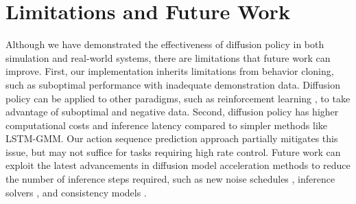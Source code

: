 
\section{Limitations and Future Work}

Although we have demonstrated the effectiveness of diffusion policy in both simulation and real-world systems, there are limitations that future work can improve. 
First, our implementation inherits limitations from behavior cloning, such as suboptimal performance with inadequate demonstration data. Diffusion policy can be applied to other paradigms, such as reinforcement learning \cite{wang2023diffusion,hansen2023idql}, to take advantage of suboptimal and negative data. 
Second, diffusion policy has higher computational costs and inference latency compared to simpler methods like LSTM-GMM. Our action sequence prediction approach partially mitigates this issue, but may not suffice for tasks requiring high rate control. Future work can exploit the latest advancements in diffusion model acceleration methods to reduce the number of inference steps required, such as new noise schedules \cite{chen2023importance}, inference solvers \cite{karras2022elucidating}, and consistency models \cite{song2023consistency}.


